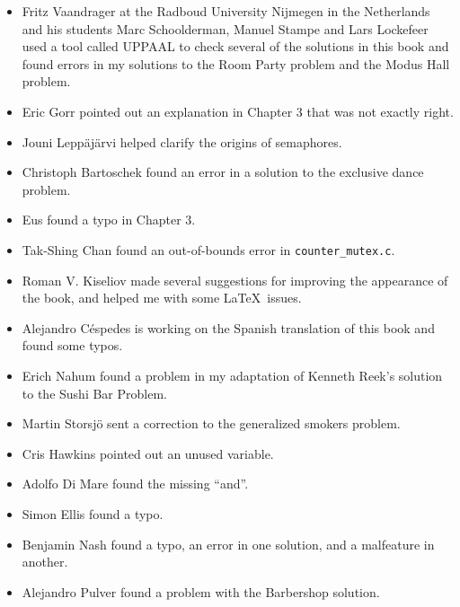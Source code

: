 \documentclass{book}
\begin{document}
\begin{itemize}
\item Fritz Vaandrager at the Radboud University Nijmegen in the
Netherlands and his students Marc Schoolderman, Manuel Stampe and Lars
Lockefeer used a tool called UPPAAL to check several of the solutions
in this book and found errors in my solutions to the Room Party problem
and the Modus Hall problem.

\item Eric Gorr pointed out an explanation in Chapter 3 that was
not exactly right.

\item Jouni Lepp\"{a}j\"{a}rvi helped clarify the origins of semaphores.

\item Christoph Bartoschek found an error in a solution to
the exclusive dance problem.

\item Eus found a typo in Chapter 3.

\item Tak-Shing Chan found an out-of-bounds error in {\tt counter\_mutex.c}.

\item Roman V. Kiseliov made several suggestions for improving
the appearance of the book, and helped me with some \LaTeX~issues.

\item Alejandro C\'{e}spedes is working on the Spanish translation of this
book and found some typos.

\item Erich Nahum found a problem in my adaptation of Kenneth Reek's
  solution to the Sushi Bar Problem.

\item Martin Storsj\"{o} sent a correction to the generalized smokers problem.

\item Cris Hawkins pointed out an unused variable.

\item Adolfo Di Mare found the missing ``and''.

\item Simon Ellis found a typo.

\item Benjamin Nash found a typo, an error in one solution, and
a malfeature in another.

\item Alejandro Pulver found a problem with the Barbershop solution.

\end{itemize}
\end{document}
